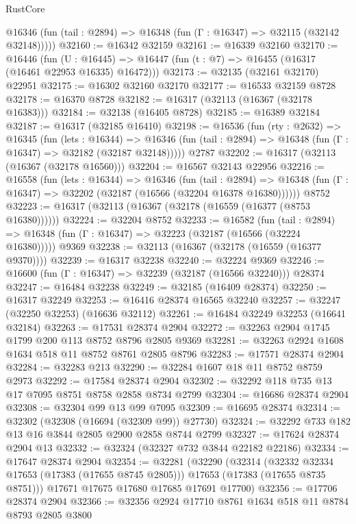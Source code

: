 \begin{lexlean}{RustCore}
\begin{coremodule}
      @16346 (fun (tail : @2894) => @16348 (fun (Γ : @16347) => @32115 (@32142 @32148)))))
@32160 := @16342 @32159
@32161 := @16339 @32160
@32170 := @16446
    (fun (U : @16445) => @16447 (fun (t : @7) => @16455 (@16317 (@16461 @22953 @16335) @16472)))
@32173 := @32135 (@32161 @32170) @22951
@32175 := @16302 @32160 @32170
@32177 := @16533 @32159 @8728
@32178 := @16370 @8728
@32182 := @16317 (@32113 (@16367 (@32178 @16383)))
@32184 := @32138 (@16405 @8728)
@32185 := @16389 @32184
@32187 := @16317 (@32185 @16410)
@32198 := @16536
    (fun (rty : @2632) =>
    @16345
      (fun (lets : @16344) =>
      @16346 (fun (tail : @2894) => @16348 (fun (Γ : @16347) => @32182 (@32187 @32148)))))
    @2787
@32202 := @16317 (@32113 (@16367 (@32178 @16560)))
@32204 := @16567 @32143 @22956
@32216 := @16558
    (fun (lets : @16344) =>
    @16346
      (fun (tail : @2894) =>
      @16348 (fun (Γ : @16347) => @32202 (@32187 (@16566 (@32204 @16378 @16380))))))
    @8752
@32223 := @16317 (@32113 (@16367 (@32178 (@16559 (@16377 (@8753 @16380))))))
@32224 := @32204 @8752
@32233 := @16582
    (fun (tail : @2894) => @16348 (fun (Γ : @16347) => @32223 (@32187 (@16566 (@32224 @16380)))))
    @9369
@32238 := @32113 (@16367 (@32178 (@16559 (@16377 @9370))))
@32239 := @16317 @32238
@32240 := @32224 @9369
@32246 := @16600 (fun (Γ : @16347) => @32239 (@32187 (@16566 @32240))) @28374
@32247 := @16484 @32238
@32249 := @32185 (@16409 @28374)
@32250 := @16317 @32249
@32253 := @16416 @28374 @16565 @32240
@32257 := @32247 (@32250 @32253) (@16636 @32112)
@32261 := @16484 @32249 @32253 (@16641 @32184)
@32263 := @17531 @28374 @2904
@32272 := @32263 @2904 @1745 @1799 @200 @113 @8752 @8796 @2805 @9369
@32281 := @32263 @2924 @1608 @1634 @518 @11 @8752 @8761 @2805 @8796
@32283 := @17571 @28374 @2904
@32284 := @32283 @213
@32290 := @32284 @1607 @18 @11 @8752 @8759 @2973
@32292 := @17584 @28374 @2904
@32302 := @32292 @118 @735 @13 @17 @7095 @8751 @8758 @2858 @8734 @2799
@32304 := @16686 @28374 @2904
@32308 := @32304 @99 @13 @99 @7095
@32309 := @16695 @28374
@32314 := @32302 (@32308 (@16694 (@32309 @99)) @27730)
@32324 := @32292 @733 @182 @13 @16 @3844 @2805 @2900 @2858 @8744 @2799
@32327 := @17624 @28374 @2904 @13
@32332 := @32324 (@32327 @732 @3844 @22182 @22186)
@32334 := @17647 @28374 @2904
@32354 := @32281
    (@32290
      (@32314
        (@32332 @32334 @17653 (@17383 (@17655 @8745 @2805)))
        @17653
        (@17383 (@17655 @8735 @8751)))
      @17671
      @17675
      @17680
      @17685
      @17691
      @17700)
@32356 := @17706 @28374 @2904
@32366 := @32356 @2924 @17710 @8761 @1634 @518 @11 @8784 @8793 @2805 @3800

\end{coremodule}
\end{lexlean}
